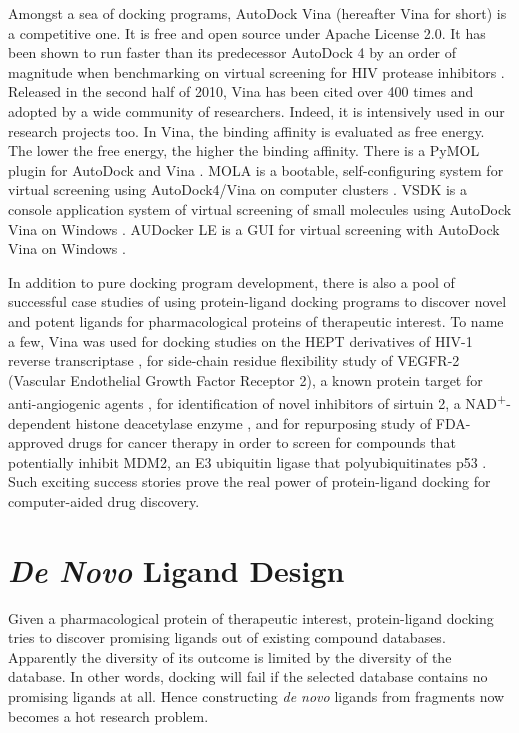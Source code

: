 Amongst a sea of docking programs, AutoDock Vina \citep{595} (hereafter Vina for short) is a competitive one. It is free and open source under Apache License 2.0. It has been shown to run faster than its predecessor AutoDock 4 \citep{596} by an order of magnitude when benchmarking on virtual screening for HIV protease inhibitors \citep{556}. Released in the second half of 2010, Vina has been cited over 400 times and adopted by a wide community of researchers. Indeed, it is intensively used in our research projects too. In Vina, the binding affinity is evaluated as free energy. The lower the free energy, the higher the binding affinity. There is a PyMOL plugin for AutoDock and Vina \citep{609}. MOLA is a bootable, self-configuring system for virtual screening using AutoDock4/Vina on computer clusters \citep{773}. VSDK is a console application system of virtual screening of small molecules using AutoDock Vina on Windows \citep{1268}. AUDocker LE is a GUI for virtual screening with AutoDock Vina on Windows \citep{1250}.

In addition to pure docking program development, there is also a pool of successful case studies of using protein-ligand docking programs to discover novel and potent ligands for pharmacological proteins of therapeutic interest. To name a few, Vina was used for docking studies on the HEPT derivatives of HIV-1 reverse transcriptase \citep{843}, for side-chain residue flexibility study of VEGFR-2 (Vascular Endothelial Growth Factor Receptor 2), a known protein target for anti-angiogenic agents \citep{1084}, for identification of novel inhibitors of sirtuin 2, a NAD\textsuperscript{+}-dependent histone deacetylase enzyme \citep{1177}, and for repurposing study of FDA-approved drugs for cancer therapy in order to screen for compounds that potentially inhibit MDM2, an E3 ubiquitin ligase that polyubiquitinates p53 \citep{1230}. Such exciting success stories prove the real power of protein-ligand docking for computer-aided drug discovery.

\section{\textit{De Novo} Ligand Design}

Given a pharmacological protein of therapeutic interest, protein-ligand docking tries to discover promising ligands out of existing compound databases. Apparently the diversity of its outcome is limited by the diversity of the database. In other words, docking will fail if the selected database contains no promising ligands at all. Hence constructing \textit{de novo} ligands from fragments now becomes a hot research problem.

